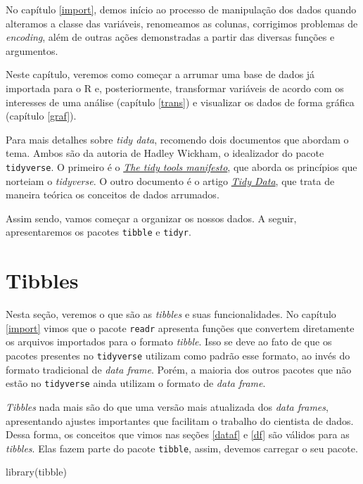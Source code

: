 \documentclass[
  brazilian,
]{book}
\newenvironment{Shaded}{\begin{snugshade}}{\end{snugshade}}
\newcommand{\FunctionTok}[1]{\textcolor[rgb]{0.00,0.00,0.00}{#1}}
\newcommand{\NormalTok}[1]{#1}
\begin{document}
No capítulo \ref{import}, demos início ao processo de manipulação dos dados quando alteramos a classe das variáveis, renomeamos as colunas, corrigimos problemas de \emph{encoding}, além de outras ações demonstradas a partir das diversas funções e argumentos.

Neste capítulo, veremos como começar a arrumar uma base de dados já importada para o R e, posteriormente, transformar variáveis de acordo com os interesses de uma análise (capítulo \ref{trans}) e visualizar os dados de forma gráfica (capítulo \ref{graf}).

Para mais detalhes sobre \emph{tidy data}, recomendo dois documentos que abordam o tema. Ambos são da autoria de Hadley Wickham, o idealizador do pacote \texttt{tidyverse}. O primeiro é o \href{https://cran.r-project.org/web/packages/tidyverse/vignettes/manifesto.html}{\emph{The tidy tools manifesto}}, que aborda os princípios que norteiam o \emph{tidyverse}. O outro documento é o artigo \href{https://www.jstatsoft.org/article/view/v059i10}{\emph{Tidy Data}}, que trata de maneira teórica os conceitos de dados arrumados.

Assim sendo, vamos começar a organizar os nossos dados. A seguir, apresentaremos os pacotes \texttt{tibble} e \texttt{tidyr}.

\hypertarget{tibbles}{%
\section{Tibbles}\label{tibbles}}

Nesta seção, veremos o que são as \emph{tibbles} e suas funcionalidades. No capítulo \ref{import} vimos que o pacote \texttt{readr} apresenta funções que convertem diretamente os arquivos importados para o formato \emph{tibble}. Isso se deve ao fato de que os pacotes presentes no \texttt{tidyverse} utilizam como padrão esse formato, ao invés do formato tradicional de \emph{data frame}. Porém, a maioria dos outros pacotes que não estão no \texttt{tidyverse} ainda utilizam o formato de \emph{data frame}.

\emph{Tibbles} nada mais são do que uma versão mais atualizada dos \emph{data frames}, apresentando ajustes importantes que facilitam o trabalho do cientista de dados. Dessa forma, os conceitos que vimos nas seções \ref{dataf} e \ref{df} são válidos para as \emph{tibbles}. Elas fazem parte do pacote \texttt{tibble}, assim, devemos carregar o seu pacote.

\begin{Shaded}
\begin{Highlighting}[]
\FunctionTok{library}\NormalTok{(tibble)}
\end{Highlighting}
\end{Shaded}
\end{document}
